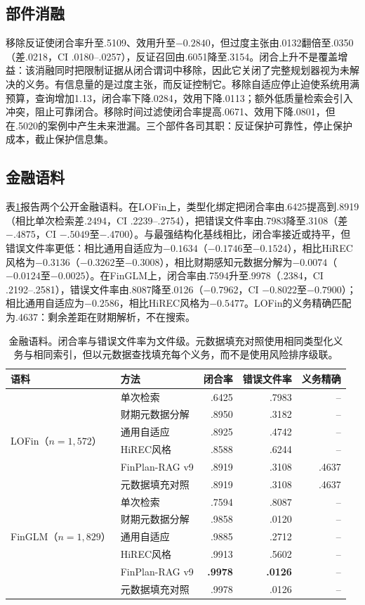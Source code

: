 \documentclass[10.5pt,a4paper]{ctexart}
\newcommand{\finplan}{FinPlan\mbox{-}RAG}
\begin{document}
\subsection{部件消融}
移除反证使闭合率升至.5109、效用升至$-0.2840$，但过度主张由.0132翻倍至.0350（差.0218，CI .0180--.0257），反证召回由.6051降至.3154。闭合上升不是覆盖增益：该消融同时把限制证据从闭合谓词中移除，因此它关闭了完整规划器视为未解决的义务。有信息量的是过度主张，而反证控制它。移除自适应停止迫使系统用满预算，查询增加1.13，闭合率下降.0284，效用下降.0113；额外低质量检索会引入冲突，阻止可靠闭合。移除时间过滤使闭合率提高.0671、效用下降.0801，但在.5020的案例中产生未来泄漏。三个部件各司其职：反证保护可靠性，停止保护成本，截止保护信息集。

\subsection{金融语料}
表\ref{tab:real}报告两个公开金融语料。在LOFin上，类型化绑定把闭合率由.6425提高到.8919（相比单次检索差.2494，CI .2239--.2754），把错误文件率由.7983降至.3108（差$-.4875$，CI $-.5049$至$-.4700$）。与最强结构化基线相比，闭合率接近或持平，但错误文件率更低：相比通用自适应为$-0.1634$（$-0.1746$至$-0.1524$），相比HiREC风格为$-0.3136$（$-0.3262$至$-0.3008$），相比财期感知元数据分解为$-0.0074$（$-0.0124$至$-0.0025$）。在FinGLM上，闭合率由.7594升至.9978（.2384，CI .2192--.2581），错误文件率由.8087降至.0126（$-0.7962$，CI $-0.8022$至$-0.7900$）；相比通用自适应为$-0.2586$，相比HiREC风格为$-0.5477$。LOFin的义务精确匹配为.4637：剩余差距在财期解析，不在搜索。

\begin{table}[t]\centering\small
\caption{金融语料。闭合率与错误文件率为文件级。元数据填充对照使用相同类型化义务与相同索引，但以元数据查找填充每个义务，而不是使用风险排序级联。}
\label{tab:real}
\begin{tabular}{llrrr}
\toprule
语料 & 方法 & 闭合率 & 错误文件率 & 义务精确\\
\midrule
\multirow{6}{*}{LOFin（$n=1{,}572$）}
 & 单次检索 & .6425 & .7983 & --\\
 & 财期元数据分解 & .8950 & .3182 & --\\
 & 通用自适应 & .8925 & .4742 & --\\
 & HiREC风格 & .8588 & .6244 & --\\
 & \finplan{} v9 & .8919 & .3108 & .4637\\
 & \quad 元数据填充对照 & .8919 & .3108 & .4637\\
\midrule
\multirow{5}{*}{FinGLM（$n=1{,}829$）}
 & 单次检索 & .7594 & .8087 & --\\
 & 财期元数据分解 & .9858 & .0120 & --\\
 & 通用自适应 & .9885 & .2712 & --\\
 & HiREC风格 & .9913 & .5602 & --\\
 & \finplan{} v9 & \textbf{.9978} & \textbf{.0126} & --\\
 & \quad 元数据填充对照 & .9978 & .0126 & --\\
\bottomrule
\end{tabular}
\end{table}
\end{document}
